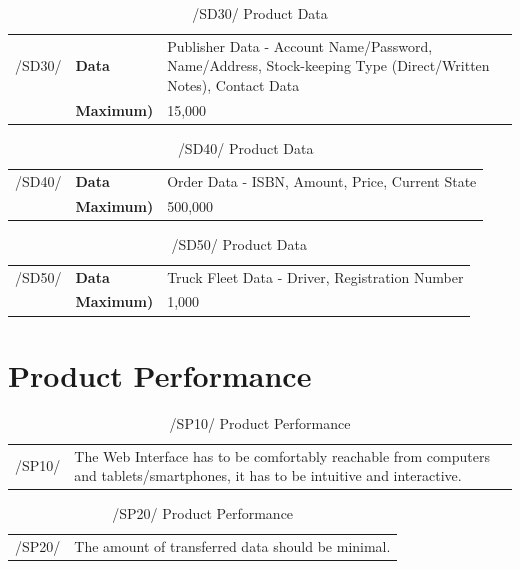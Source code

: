 \documentclass[11pt,a4paper,oneside,svgnames]{report}
\begin{document}
\begin{table}[H]
\centering
\begin{tabular}{p{1.5cm}p{3cm}p{8cm}}
\cellcolor{white}/SD30/	& \textbf{Data}	& Publisher Data - Account Name/Password, Name/Address, Stock-keeping Type (Direct/Written Notes), Contact Data \\
\cellcolor{white}		& \textbf{Maximum)} & 15,000 \\
\end{tabular}
\caption{/SD30/ Product Data}
\end{table}

\begin{table}[H]
\centering
\begin{tabular}{p{1.5cm}p{3cm}p{8cm}}
\cellcolor{white}/SD40/	& \textbf{Data}	& Order Data - ISBN, Amount, Price, Current State\\
\cellcolor{white}		& \textbf{Maximum)} & 500,000 \\
\end{tabular}
\caption{/SD40/ Product Data}
\end{table}

\begin{table}[H]
\centering
\begin{tabular}{p{1.5cm}p{3cm}p{8cm}}
\cellcolor{white}/SD50/	& \textbf{Data}	& Truck Fleet Data - Driver, Registration Number \\
\cellcolor{white}		& \textbf{Maximum)} &  1,000 \\
\end{tabular}
\caption{/SD50/ Product Data}
\end{table}

\chapter{Product Performance}

\begin{table}[H]
\centering
\begin{tabular}{p{1.5cm}p{11cm}}
\cellcolor{white}/SP10/ & The Web Interface has to be comfortably reachable from computers and tablets/smartphones, it has to be intuitive and interactive.\\
\end{tabular}
\caption{/SP10/ Product Performance}
\end{table}

\begin{table}[H]
\centering
\begin{tabular}{p{1.5cm}p{11cm}}
\cellcolor{white}/SP20/ & The amount of transferred data should be minimal. \\
\end{tabular}
\caption{/SP20/ Product Performance}
\end{table}
\end{document}
